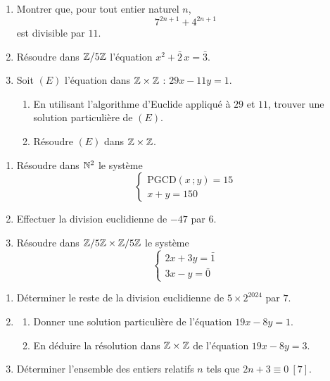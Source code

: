 \begin{enumerate}
	\item Montrer que, pour tout entier naturel $n$,
	$$
	7^{2n+1} + 4^{2n+1}
	$$
	est divisible par $11$.
	\item Résoudre dans $\mathbb{Z}/5\mathbb{Z}$ l'équation $x^2 + \bar{2}\,x = \bar{3}$.
	\item Soit $(E)$ l'équation dans $\mathbb{Z} \times \mathbb{Z}$ : $29x - 11y = 1$.
	\begin{enumerate}
		\item En utilisant l'algorithme d'Euclide appliqué à $29$ et $11$,
		trouver une solution particulière de $(E)$.
		\item Résoudre $(E)$ dans $\mathbb{Z} \times \mathbb{Z}$.
	\end{enumerate}
\end{enumerate}

\begin{enumerate}
	\item Résoudre dans $\mathbb{N}^2$ le système
	$$
	\begin{cases}
		\mathrm{PGCD}(x\,;y) = 15 \\
		x + y = 150
	\end{cases}
	$$
	\item Effectuer la division euclidienne de $-47$ par $6$.
	\item Résoudre dans $\mathbb{Z}/5\mathbb{Z} \times \mathbb{Z}/5\mathbb{Z}$ le système
	$$
	\begin{cases}
		2x + 3y = \bar{1} \\
		3x - y = \bar{0}
	\end{cases}
	$$
\end{enumerate}

\begin{enumerate}
	\item Déterminer le reste de la division euclidienne de $5 \times 2^{2024}$
	par $7$.
	\item
	\begin{enumerate}
		\item Donner une solution particulière de l'équation $19x - 8y = 1$.
		\item En déduire la résolution dans $\mathbb{Z} \times \mathbb{Z}$ de l'équation
		$19x - 8y = 3$.
	\end{enumerate}
	\item Déterminer l'ensemble des entiers relatifs $n$ tels que
	$2n + 3 \equiv 0\ [7]$.
\end{enumerate}

